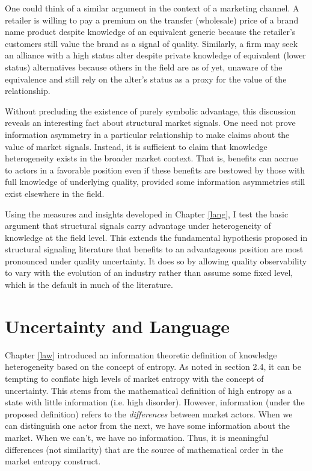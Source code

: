 One could think of a similar argument in the context of a marketing channel. A retailer is willing to pay a premium on the transfer (wholesale) price of a brand name product despite knowledge of an equivalent generic because the retailer's customers still value the brand as a signal of quality. Similarly, a firm may seek an alliance with a high status alter despite private knowledge of equivalent (lower status) alternatives because others in the field are as of yet, unaware of the equivalence and still rely on the alter's status as a proxy for the value of the relationship.  

Without precluding the existence of purely symbolic advantage, this discussion reveals an interesting fact about structural market signals. One need not prove information asymmetry in a particular relationship to make claims about the value of market signals. Instead, it is sufficient to claim that knowledge heterogeneity exists in the broader market context. That is, benefits can accrue to actors in a favorable position even if these benefits are bestowed by those with full knowledge of underlying quality, provided some information asymmetries still exist elsewhere in the field.  

Using the measures and insights developed in Chapter \ref{lang}, I test the basic argument that structural signals carry advantage under heterogeneity of knowledge at the field level. This extends the fundamental hypothesis proposed in structural signaling literature that benefits to an advantageous position are most pronounced under quality uncertainty. It does so by allowing quality observability to vary with the evolution of an industry rather than assume some fixed level, which is the default in much of the literature. 

\section{Uncertainty and Language}
Chapter \ref{law} introduced an information theoretic definition of knowledge heterogeneity based on the concept of entropy. As noted in section 2.4, it can be tempting to conflate high levels of market entropy with the concept of uncertainty. This stems from the mathematical definition of high entropy as a state with little information (i.e. high disorder). However, information (under the proposed definition) refers to the \emph{differences} between market actors. When we can distinguish one actor from the next, we have some information about the market. When we can't, we have no information. Thus, it is meaningful differences (not similarity) that are the source of mathematical order in the market entropy construct. 

